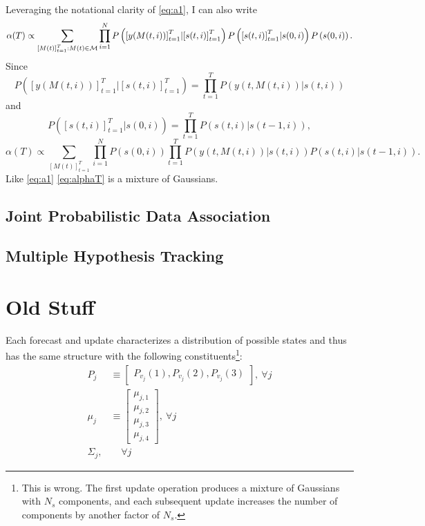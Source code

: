 \documentclass[12pt]{article}
\newcommand{\M}{{\cal M}}
\newcommand{\ti}[2]{{#1}{(#2)}}                         %
\newcommand{\ts}[4]{{\left[ #1(#2) \right]}_{#3}^{#4}} %
\begin{document}
Leveraging the notational clarity of \eqref{eq:a1}, I can also write
\begin{equation*}
  \ti{\alpha}{T} \propto \sum_{\ts{M}{t}{t=1}{T}:\ti{M}{t}\in \M}
  \prod_{i=1}^N
  P\left( \ts{y}{\ti{M}{t,i}}{t=1}{T} | \ts{s}{t,i}{t=1}{T}\right)
  P\left( \ts{s}{t,i}{t=1}{T}| \ti{s}{0,i} \right)
  P\left( \ti{s}{0,i} \right) .
\end{equation*}
Since
\begin{equation*}
  P\left( \ts{y}{\ti{M}{t,i}}{t=1}{T} | \ts{s}{t,i}{t=1}{T}\right) =
  \prod_{t=1}^T P\left( \ti{y}{t,\ti{M}{t,i}} | \ti{s}{t,i}\right)
\end{equation*}
and
\begin{equation*}
  P\left( \ts{s}{t,i}{t=1}{T}| \ti{s}{0,i} \right) = \prod_{t=1}^T
  P\left( \ti{s}{t,i} | \ti{s}{t-1,i}\right),
\end{equation*}
\begin{equation}
  \label{eq:alphaT}
  \ti{\alpha}{T} \propto \sum_{\ts{M}{t}{t=1}{T}}
  \prod_{i=1}^N  P\left( \ti{s}{0,i} \right) \prod_{t=1}^T
  P\left( \ti{y}{t,\ti{M}{t,i}} | \ti{s}{t,i}\right)
  P\left( \ti{s}{t,i} | \ti{s}{t-1,i}\right).
\end{equation}
Like \eqref{eq:a1} \eqref{eq:alphaT} is a mixture of Gaussians.

\subsection{Joint Probabilistic Data Association}
\label{sec:JPDA}

\subsection{Multiple Hypothesis Tracking}
\label{sec:MHT}

\section{Old Stuff}
\label{sec:old-stuff}

Each forecast and update characterizes a distribution of possible
states and thus has the same structure with the following
constituents\footnote{This is wrong.  The first update operation
  produces a mixture of Gaussians with $N_s$ components, and each
  subsequent update increases the number of components by another
  factor of $N_s$.}:
\begin{subequations}
  \label{eq:psForm}
  \begin{align}
    P_j &\equiv \begin{bmatrix} P_{v_j}(1), P_{v_j}(2), P_{v_j}(3)
    \end{bmatrix}, ~\forall j\\
    \mu_j &\equiv \begin{bmatrix} \mu_{j,1} \\ \mu_{j,2} \\ \mu_{j,3} \\
      \mu_{j,4} \end{bmatrix}, ~\forall j\\
    \Sigma_j, &~~~~~\forall j
  \end{align}
\end{subequations}
\end{document}
